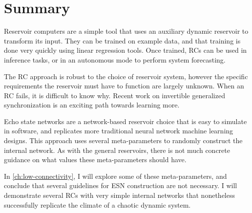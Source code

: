 \section{Summary}

Reservoir computers are a simple tool that uses an auxiliary dynamic
reservoir to transform its input. They can be trained on example data,
and that training is done very quickly using linear regression
tools. Once trained, RCs can be used in inference tasks, or in an
autonomous mode to perform system forecasting.

The RC approach is robust to the choice of reservoir system, however
the specific requirements the reservoir must have to function are
largely unknown. When an RC fails, it is difficult to know why. Recent
work on invertible generalized synchronization is an exciting path
towards learning more.

Echo state networks are a network-based reservoir choice that is easy
to simulate in software, and replicates more traditional neural
network machine learning designs. This approach uses several
meta-parameters to randomly construct the internal network. As with the
general reservoirs, there is not much concrete guidance on what values
these meta-parameters should have.

In \cref{ch:low-connectivity}, I will explore some of these
meta-parameters, and conclude that several guidelines for ESN
construction are not necessary. I will demonstrate several RCs with
very simple internal networks that nonetheless successfully replicate
the climate of a chaotic dynamic system.
